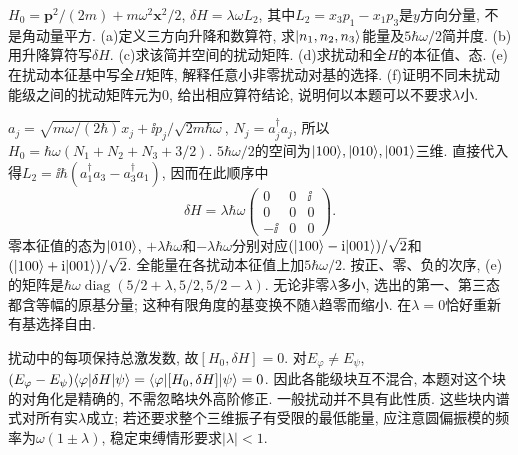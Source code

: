 \begin{exercise}
$H_0=\boldsymbol p^2/(2m)+m\omega^2\boldsymbol x^2/2$, $\delta H=\lambda\omega L_2$, 其中$L_2=x_3p_1-x_1p_3$是$y$方向分量, 不是角动量平方. (a)定义三方向升降和数算符, 求$\lvert n_1,n_2,n_3\rangle$能量及$5\hbar\omega/2$简并度. (b)用升降算符写$\delta H$. (c)求该简并空间的扰动矩阵. (d)求扰动和全$H$的本征值、态. (e)在扰动本征基中写全$H$矩阵, 解释任意小非零扰动对基的选择. (f)证明不同未扰动能级之间的扰动矩阵元为0, 给出相应算符结论, 说明何以本题可以不要求$\lambda$小.
\end{exercise}
\begin{solution}
$a_j=\sqrt{m\omega/(2\hbar)}x_j+\ii p_j/\sqrt{2m\hbar\omega}$, $N_j=a_j^\dagger a_j$, 所以$H_0=\hbar\omega(N_1+N_2+N_3+3/2)$. $5\hbar\omega/2$的空间为$\lvert 100\rangle,\lvert 010\rangle,\lvert 001\rangle$三维. 直接代入得$L_2=\ii\hbar(a_1^\dagger a_3-a_3^\dagger a_1)$, 因而在此顺序中
\[
\delta H=\lambda\hbar\omega\begin{pmatrix}0&0&\ii\\0&0&0\\-\ii&0&0\end{pmatrix}.
\]
零本征值的态为$\lvert 010\rangle$, $+\lambda\hbar\omega$和$-\lambda\hbar\omega$分别对应$(\lvert 100\rangle-\mathrm i\lvert 001\rangle)/\sqrt2$和$(\lvert 100\rangle+\mathrm i\lvert 001\rangle)/\sqrt2$. 全能量在各扰动本征值上加$5\hbar\omega/2$. 按正、零、负的次序, (e)的矩阵是$\hbar\omega\operatorname{diag}(5/2+\lambda,5/2,5/2-\lambda)$. 无论非零$\lambda$多小, 选出的第一、第三态都含等幅的原基分量; 这种有限角度的基变换不随$\lambda$趋零而缩小. 在$\lambda=0$恰好重新有基选择自由.

扰动中的每项保持总激发数, 故$[H_0,\delta H]=0$. 对$E_\varphi\neq E_\psi$, $(E_\varphi-E_\psi)\langle \varphi\rvert\delta H\lvert \psi\rangle=\langle \varphi\rvert[H_0,\delta H]\lvert \psi\rangle=0$. 因此各能级块互不混合, 本题对这个块的对角化是精确的, 不需忽略块外高阶修正. 一般扰动并不具有此性质. 这些块内谱式对所有实$\lambda$成立; 若还要求整个三维振子有受限的最低能量, 应注意圆偏振模的频率为$\omega(1\pm\lambda)$, 稳定束缚情形要求$|\lambda|<1$.
\end{solution}

